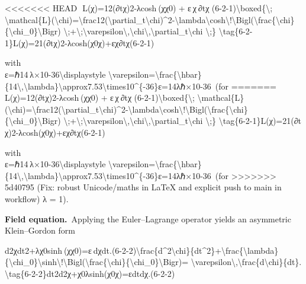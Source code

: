 \documentclass[]{article}
\begin{document}
<<<<<<< HEAD
  L(χ)=12(∂tχ)2-λcosh⁡ ⁣(χχ0)  +  ε χ ∂tχ  (6-2-1)\textbackslash boxed\{\textbackslash;
\textbackslash mathcal\{L\}(\textbackslash chi)=\textbackslash frac12(\textbackslash partial\_t\textbackslash chi)\^{}2-\textbackslash lambda\textbackslash cosh\textbackslash!\textbackslash Bigl(\textbackslash frac\{\textbackslash chi\}\{\textbackslash chi\_0\}\textbackslash Bigr)
\textbackslash;+\textbackslash;\textbackslash varepsilon\textbackslash,\textbackslash chi\textbackslash,\textbackslash partial\_t\textbackslash chi
\textbackslash;\}
\textbackslash tag\{6-2-1\}L(χ)=21\hspace{0pt}(∂t\hspace{0pt}χ)2-λcosh(χ0\hspace{0pt}χ\hspace{0pt})+εχ∂t\hspace{0pt}χ\hspace{0pt}(6-2-1)

with\\
ε=ℏ14 λ×10-36\textbackslash displaystyle
\textbackslash varepsilon=\textbackslash frac\{\textbackslash hbar\}\{14\textbackslash,\textbackslash lambda\}\textbackslash approx7.53\textbackslash times10\^{}\{-36\}ε=14λℏ\hspace{0pt}×10-36 (for
=======
  L(χ)=12(∂tχ)2-λcosh⁡ ⁣(χχ0)  +  ε χ ∂tχ  (6-2-1)\textbackslash{}boxed\{\textbackslash{};
\textbackslash{}mathcal\{L\}(\textbackslash{}chi)=\textbackslash{}frac12(\textbackslash{}partial\_t\textbackslash{}chi)\^{}2-\textbackslash{}lambda\textbackslash{}cosh\textbackslash{}!\textbackslash{}Bigl(\textbackslash{}frac\{\textbackslash{}chi\}\{\textbackslash{}chi\_0\}\textbackslash{}Bigr)
\textbackslash{};+\textbackslash{};\textbackslash{}varepsilon\textbackslash{},\textbackslash{}chi\textbackslash{},\textbackslash{}partial\_t\textbackslash{}chi
\textbackslash{};\}
\textbackslash{}tag\{6-2-1\}L(χ)=21​(∂t​χ)2-λcosh(χ0​χ​)+εχ∂t​χ​(6-2-1)

with\\
ε=ℏ14 λ×10-36\textbackslash{}displaystyle
\textbackslash{}varepsilon=\textbackslash{}frac\{\textbackslash{}hbar\}\{14\textbackslash{},\textbackslash{}lambda\}\textbackslash{}approx7.53\textbackslash{}times10\^{}\{-36\}ε=14λℏ​×10-36 (for
>>>>>>> 5d40795 (Fix: robust Unicode/maths in LaTeX and explicit push to main in workflow)
λ = 1).

\textbf{Field equation.} Applying the Euler--Lagrange operator yields an
asymmetric Klein--Gordon form

d2χdt2+λχ0sinh⁡ ⁣(χχ0)=ε dχdt.(6-2-2)\textbackslash{}frac\{d\^{}2\textbackslash{}chi\}\{dt\^{}2\}+\textbackslash{}frac\{\textbackslash{}lambda\}\{\textbackslash{}chi\_0\}\textbackslash{}sinh\textbackslash{}!\textbackslash{}Bigl(\textbackslash{}frac\{\textbackslash{}chi\}\{\textbackslash{}chi\_0\}\textbackslash{}Bigr)=
\textbackslash{}varepsilon\textbackslash{},\textbackslash{}frac\{d\textbackslash{}chi\}\{dt\}.
\textbackslash{}tag\{6-2-2\}dt2d2χ​+χ0​λ​sinh(χ0​χ​)=εdtdχ​.(6-2-2)
\end{document}
